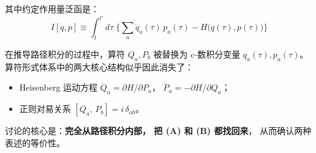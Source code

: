 其中约定作用量泛函是：
\begin{equation}\label{eq:action-func}
  I[q,p] \equiv \int_{t}^{t'}\!d\tau\;\biggl\{
    \sum_a\dot{q}_a(\tau)\,p_a(\tau)
    -H\bigl(q(\tau),p(\tau)\bigr)
  \biggr\}
\end{equation}

\topictitle{***}
在推导路径积分的过程中，算符 $Q_a,P_b$
被替换为 c-数积分变量 $q_a(\tau),p_a(\tau)$。
算符形式体系中的两大核心结构似乎因此消失了：
\begin{itemize}
  \item[(A)] Heisenberg 运动方程
    $\dot{Q}_a=\partial H/\partial P_a$，
    $\dot{P}_a=-\partial H/\partial Q_a$；
  \item[(B)] 正则对易关系
    $[Q_a,\,P_b]=i\,\delta_{ab}$。
\end{itemize}
讨论的核心是：\textbf{完全从路径积分内部，
把 (A) 和 (B) 都找回来}，
从而确认两种表述的等价性。


